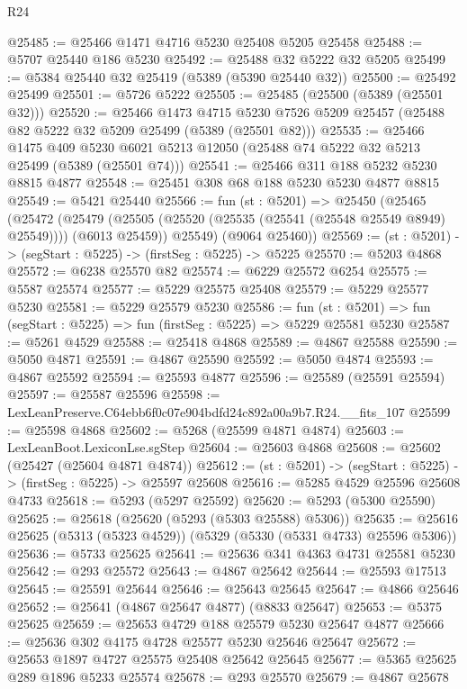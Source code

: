 \begin{lexlean}{R24}
\begin{coremodule}
@25485 := @25466 @1471 @4716 @5230 @25408 @5205 @25458
@25488 := @5707 @25440 @186 @5230
@25492 := @25488 @32 @5222 @32 @5205
@25499 := @5384 @25440 @32 @25419 (@5389 (@5390 @25440 @32))
@25500 := @25492 @25499
@25501 := @5726 @5222
@25505 := @25485 (@25500 (@5389 (@25501 @32)))
@25520 := @25466
    @1473
    @4715
    @5230
    @7526
    @5209
    @25457
    (@25488 @82 @5222 @32 @5209 @25499 (@5389 (@25501 @82)))
@25535 := @25466
    @1475
    @409
    @5230
    @6021
    @5213
    @12050
    (@25488 @74 @5222 @32 @5213 @25499 (@5389 (@25501 @74)))
@25541 := @25466 @311 @188 @5232 @5230 @8815 @4877
@25548 := @25451 @308 @68 @188 @5230 @5230 @4877 @8815
@25549 := @5421 @25440
@25566 := fun (st : @5201) =>
  @25450
    (@25465
      (@25472
        (@25479 (@25505 (@25520 (@25535 (@25541 (@25548 @25549 @8949) @25549)))) (@6013 @25459))
        @25549)
      (@9064 @25460))
@25569 := (st : @5201) -> (segStart : @5225) -> (firstSeg : @5225) -> @5225
@25570 := @5203 @4868
@25572 := @6238 @25570 @82
@25574 := @6229 @25572 @6254
@25575 := @5587 @25574
@25577 := @5229 @25575 @25408
@25579 := @5229 @25577 @5230
@25581 := @5229 @25579 @5230
@25586 := fun (st : @5201) => fun (segStart : @5225) => fun (firstSeg : @5225) => @5229 @25581 @5230
@25587 := @5261 @4529
@25588 := @25418 @4868
@25589 := @4867 @25588
@25590 := @5050 @4871
@25591 := @4867 @25590
@25592 := @5050 @4874
@25593 := @4867 @25592
@25594 := @25593 @4877
@25596 := @25589 (@25591 @25594)
@25597 := @25587 @25596
@25598 := LexLeanPreserve.C64ebb6f0c07e904bdfd24c892a00a9b7.R24.__fits_107
@25599 := @25598 @4868
@25602 := @5268 (@25599 @4871 @4874)
@25603 := LexLeanBoot.LexiconLse.sgStep
@25604 := @25603 @4868
@25608 := @25602 (@25427 (@25604 @4871 @4874))
@25612 := (st : @5201) -> (segStart : @5225) -> (firstSeg : @5225) -> @25597 @25608
@25616 := @5285 @4529 @25596 @25608 @4733
@25618 := @5293 (@5297 @25592)
@25620 := @5293 (@5300 @25590)
@25625 := @25618 (@25620 (@5293 (@5303 @25588) @5306))
@25635 := @25616 @25625 (@5313 (@5323 @4529)) (@5329 (@5330 (@5331 @4733) @25596 @5306))
@25636 := @5733 @25625
@25641 := @25636 @341 @4363 @4731 @25581 @5230
@25642 := @293 @25572
@25643 := @4867 @25642
@25644 := @25593 @17513
@25645 := @25591 @25644
@25646 := @25643 @25645
@25647 := @4866 @25646
@25652 := @25641 (@4867 @25647 @4877) (@8833 @25647)
@25653 := @5375 @25625
@25659 := @25653 @4729 @188 @25579 @5230 @25647 @4877
@25666 := @25636 @302 @4175 @4728 @25577 @5230 @25646 @25647
@25672 := @25653 @1897 @4727 @25575 @25408 @25642 @25645
@25677 := @5365 @25625 @289 @1896 @5233 @25574
@25678 := @293 @25570
@25679 := @4867 @25678

\end{coremodule}
\end{lexlean}
